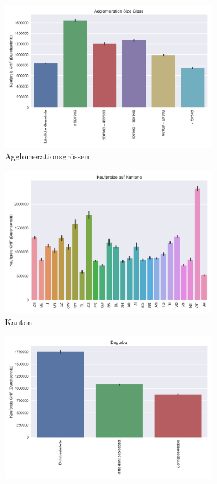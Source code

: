 \begin{figure}[h]
\begin{subfigure}{.5\textwidth}
  \centering
  \includegraphics[width=\linewidth]{images/anhang/analysis/barplot_agglomeration_size_class_id.png}
  \caption{Agglomerationsgrössen}
\end{subfigure}
\begin{subfigure}{.5\textwidth}
  \centering
  \includegraphics[width=\linewidth]{images/anhang/analysis/barplot_canton.png}
  \caption{Kanton} 
\end{subfigure}
\begin{subfigure}{.5\textwidth}
  \centering
  \includegraphics[width=\linewidth]{images/anhang/analysis/barplot_degurba_id.png}

\end{subfigure}
\end{figure}

